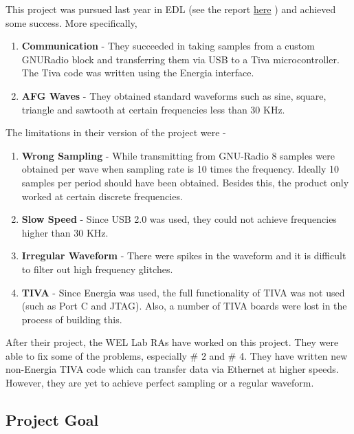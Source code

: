 \documentclass{article}
\begin{document}
This project was pursued last year in EDL (see the report \href{https://drive.google.com/file/d/0B4kwMSErfxapeTFRY1BxZ2dSYUU/view}{here} ) and achieved some success. More specifically,
\begin{enumerate}
  \item \textbf{Communication} - They succeeded in taking samples from a custom GNURadio block and transferring them via USB to a Tiva microcontroller. The Tiva code was written using the Energia interface.
  \item \textbf{AFG Waves} - They obtained standard waveforms such as sine, square, triangle and sawtooth at certain frequencies less than 30 KHz.
\end{enumerate}
The limitations in their version of the project were -
\begin{enumerate}
  \item \textbf{Wrong Sampling} - While transmitting from GNU-Radio 8 samples were obtained per wave when sampling rate is 10 times the frequency. Ideally 10 samples per period should have been obtained. Besides this, the product only worked at certain discrete frequencies.
  \item \textbf{Slow Speed} - Since USB 2.0 was used, they could not achieve frequencies higher than 30 KHz.
  \item \textbf{Irregular Waveform} - There were spikes in the waveform and it is difficult to filter out high frequency glitches.
  \item \textbf{TIVA} - Since Energia was used, the full functionality of TIVA was not used (such as Port C and JTAG). Also, a number of TIVA boards were lost in the process of building this.
\end{enumerate}
After their project, the WEL Lab RAs have worked on this project. They were able to fix some of the problems, especially $ \# $ 2 and $ \# $ 4. They have written new non-Energia TIVA code which can transfer data via Ethernet at higher speeds. However, they are yet to achieve perfect sampling or a regular waveform.
\subsection{Project Goal}
\end{document}
